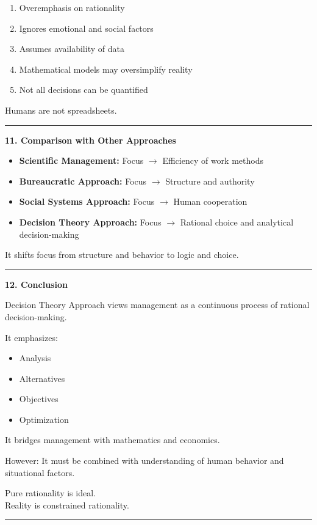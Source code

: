 \documentclass[10pt,a4paper]{article}
\newcommand{\separator}{\vspace{0.4em}\noindent\rule{\linewidth}{0.6pt}\vspace{0.4em}}
\begin{document}
\begin{enumerate}
  \item Overemphasis on rationality
  \item Ignores emotional and social factors
  \item Assumes availability of data
  \item Mathematical models may oversimplify reality
  \item Not all decisions can be quantified
\end{enumerate}

Humans are not spreadsheets.

\separator

\textbf{11. Comparison with Other Approaches}

\begin{itemize}
  \item \textbf{Scientific Management:} Focus $\rightarrow$ Efficiency of work methods
  \item \textbf{Bureaucratic Approach:} Focus $\rightarrow$ Structure and authority
  \item \textbf{Social Systems Approach:} Focus $\rightarrow$ Human cooperation
  \item \textbf{Decision Theory Approach:} Focus $\rightarrow$ Rational choice and analytical decision-making
\end{itemize}

It shifts focus from structure and behavior to logic and choice.

\separator

\textbf{12. Conclusion}

Decision Theory Approach views management as a continuous process of rational decision-making.

It emphasizes:
\begin{itemize}
  \item Analysis
  \item Alternatives
  \item Objectives
  \item Optimization
\end{itemize}

It bridges management with mathematics and economics.

However: It must be combined with understanding of human behavior and situational factors.

Pure rationality is ideal.\\
Reality is constrained rationality.

\separator
\end{document}
